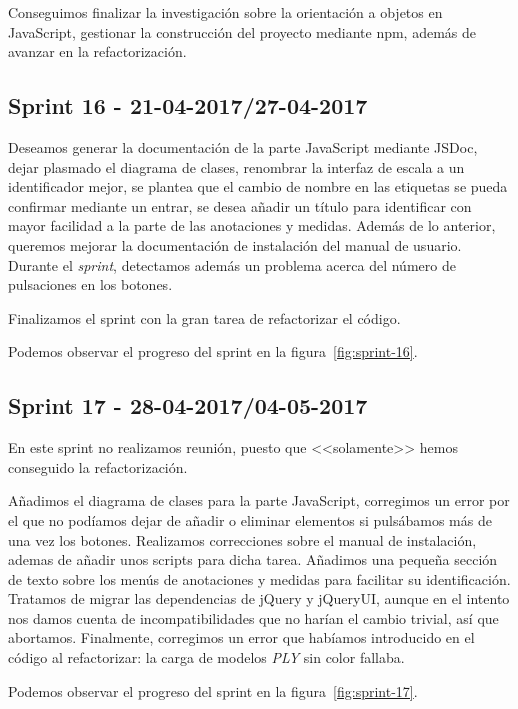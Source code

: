 Conseguimos finalizar la investigación sobre la orientación a objetos en JavaScript, gestionar la construcción del proyecto mediante npm, además de avanzar en la refactorización.


\subsection{Sprint 16 - 21-04-2017/27-04-2017}
Deseamos generar la documentación de la parte JavaScript mediante JSDoc, dejar plasmado el diagrama de clases, renombrar la interfaz de escala a un identificador mejor, se plantea que el cambio de nombre en las etiquetas se pueda confirmar mediante un entrar, se desea añadir un título para identificar con mayor facilidad a la parte de las anotaciones y medidas. Además de lo anterior, queremos mejorar la documentación de instalación del manual de usuario. Durante el \textit{sprint}, detectamos además un problema acerca del número de pulsaciones en los botones.

Finalizamos el sprint con la gran tarea de refactorizar el código.

Podemos observar el progreso del sprint en la figura~\ref{fig:sprint-16}.

\subsection{Sprint 17 - 28-04-2017/04-05-2017}
En este sprint no realizamos reunión, puesto que <<solamente>>  hemos conseguido la refactorización.

Añadimos el diagrama de clases para la parte JavaScript, corregimos un error por el que no podíamos dejar de añadir o eliminar elementos si pulsábamos más de una vez los botones. Realizamos correcciones sobre el manual de instalación, ademas de añadir unos scripts para dicha tarea. Añadimos una pequeña sección de texto sobre los menús de anotaciones y medidas para facilitar su identificación. Tratamos de migrar las dependencias de jQuery y jQueryUI, aunque en el intento nos damos cuenta de incompatibilidades que no harían el cambio trivial, así que abortamos. Finalmente, corregimos un error que habíamos introducido en el código al refactorizar: la carga de modelos \textit{PLY} sin color fallaba.

Podemos observar el progreso del sprint en la figura~\ref{fig:sprint-17}.

